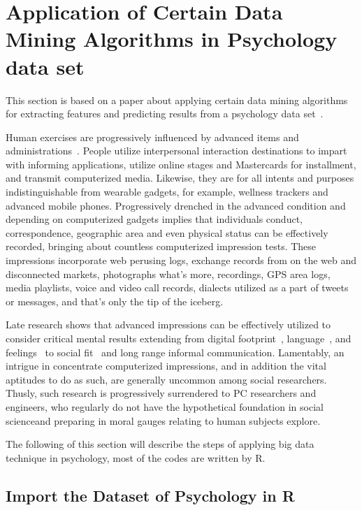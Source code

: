 \section{Application of Certain Data Mining 
Algorithms in Psychology data set}

This section is based on a paper about applying certain data mining
 algorithms for extracting features and predicting results from a 
psychology data set~\cite{hid515-12}.

Human exercises are progressively influenced by advanced items and 
administrations~\cite{hid515-13}.
People utilize interpersonal interaction destinations to impart 
with informing applications, utilize online stages and Mastercards 
for installment, and transmit computerized media. Likewise, they 
are for all intents and purposes indistinguishable from wearable 
gadgets, for example, wellness 
trackers and advanced mobile phones. Progressively drenched in the
 advanced 
condition and depending on computerized gadgets implies that 
individuals
conduct, correspondence, geographic area and even physical 
status can be effectively recorded, bringing about countless 
computerized impression tests. These impressions incorporate web 
perusing 
logs, exchange records from on the web and disconnected markets, 
photographs 
what's more, recordings, GPS area logs, media playlists, voice and
 video 
call records, dialects utilized as a part of tweets or messages, 
and that's only the tip of the iceberg.

Late research shows that advanced impressions can be effectively 
utilized to consider critical mental results 
extending from digital footprint~\cite{hid515-14}, 
language~\cite{hid515-15}, and feelings~\cite{hid515-16}  
to social fit~\cite{hid515-17} and long range informal communication. 
Lamentably, an intrigue in concentrate computerized impressions, 
and in addition the vital aptitudes 
to do as such, are generally uncommon among social researchers. Thusly, 
such research is progressively surrendered to PC researchers and 
engineers, who regularly do not have the hypothetical foundation in
 social scienceand preparing in moral gauges relating to human 
subjects explore.

The following of this section will describe the steps of applying 
big data technique in psychology, most of the codes are written by R.

\subsection{Import the Dataset of Psychology in R~\cite{hid515-12}}

